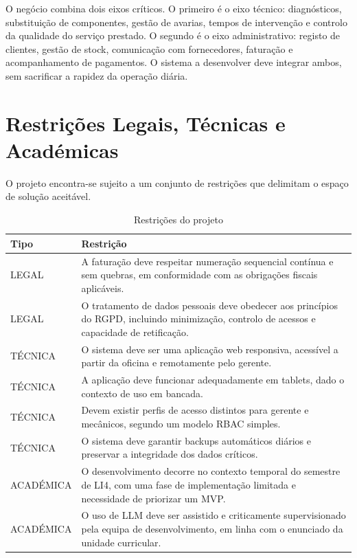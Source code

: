 \documentclass[a4paper,12pt]{scrreprt}
\begin{document}
        O negócio combina dois eixos críticos. O primeiro é o eixo técnico: diagnósticos, substituição de componentes, gestão de avarias, tempos de intervenção e controlo da qualidade do serviço prestado. O segundo é o eixo administrativo: registo de clientes, gestão de stock, comunicação com fornecedores, faturação e acompanhamento de pagamentos. O sistema a desenvolver deve integrar ambos, sem sacrificar a rapidez da operação diária.

    \section{Restrições Legais, Técnicas e Académicas}
        O projeto encontra-se sujeito a um conjunto de restrições que delimitam o espaço de solução aceitável.

        \begin{table}[H]
            \centering
            \small
            \begin{tabular}{|p{2.2cm}|p{11.8cm}|}
                \hline
                \rowcolor{gray!20!white}
                \textbf{Tipo} & \textbf{Restrição} \\
                \hline
                LEGAL & A faturação deve respeitar numeração sequencial contínua e sem quebras, em conformidade com as obrigações fiscais aplicáveis. \\
                \hline
                LEGAL & O tratamento de dados pessoais deve obedecer aos princípios do RGPD, incluindo minimização, controlo de acessos e capacidade de retificação. \\
                \hline
                TÉCNICA & O sistema deve ser uma aplicação web responsiva, acessível a partir da oficina e remotamente pelo gerente. \\
                \hline
                TÉCNICA & A aplicação deve funcionar adequadamente em tablets, dado o contexto de uso em bancada. \\
                \hline
                TÉCNICA & Devem existir perfis de acesso distintos para gerente e mecânicos, segundo um modelo RBAC simples. \\
                \hline
                TÉCNICA & O sistema deve garantir backups automáticos diários e preservar a integridade dos dados críticos. \\
                \hline
                ACADÉMICA & O desenvolvimento decorre no contexto temporal do semestre de LI4, com uma fase de implementação limitada e necessidade de priorizar um MVP. \\
                \hline
                ACADÉMICA & O uso de LLM deve ser assistido e criticamente supervisionado pela equipa de desenvolvimento, em linha com o enunciado da unidade curricular. \\
                \hline
            \end{tabular}
            \caption{Restrições do projeto}
        \end{table}
\end{document}
